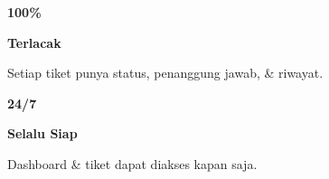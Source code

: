 \documentclass[a4paper]{article}
\begin{document}
\begin{minipage}[t]{0.485\textwidth}
    \noindent\colorbox{BlueBg}{%
        \begin{minipage}[t][2.7cm][c]{\dimexpr\linewidth-2\fboxsep\relax}
            \centering
            {\fontsize{20}{24}\selectfont\bfseries\color{BluePrimary} 100\%}\par\vspace{2pt}
            {\fontsize{9.5}{12}\selectfont\bfseries\color{BlueDark} Terlacak}\par\vspace{2pt}
            {\fontsize{8.5}{11}\selectfont\color{TextDark}Setiap tiket punya status, penanggung jawab, \& riwayat.}
        \end{minipage}}\par
    \vspace{6pt}
    \noindent\colorbox{BlueBg}{%
        \begin{minipage}[t][2.7cm][c]{\dimexpr\linewidth-2\fboxsep\relax}
            \centering
            {\fontsize{20}{24}\selectfont\bfseries\color{BluePrimary} 24/7}\par\vspace{2pt}
            {\fontsize{9.5}{12}\selectfont\bfseries\color{BlueDark} Selalu Siap}\par\vspace{2pt}
            {\fontsize{8.5}{11}\selectfont\color{TextDark}Dashboard \& tiket dapat diakses kapan saja.}
        \end{minipage}}%
\end{minipage}

\vspace{8pt}
\end{document}
